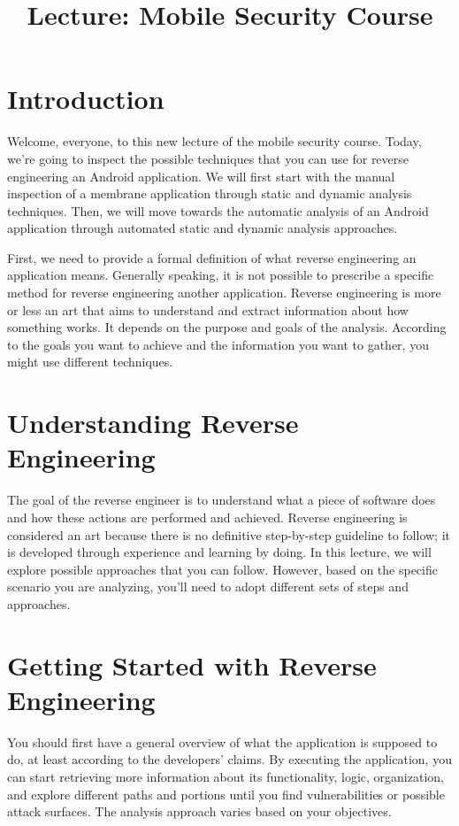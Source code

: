 \documentclass{article}
\title{Lecture: Mobile Security Course}
\author{}
\date{}
\begin{document}
\maketitle

\section*{Introduction}
Welcome, everyone, to this new lecture of the mobile security course. Today, we're going to inspect the possible techniques that you can use for reverse engineering an Android application. We will first start with the manual inspection of a membrane application through static and dynamic analysis techniques. Then, we will move towards the automatic analysis of an Android application through automated static and dynamic analysis approaches.

First, we need to provide a formal definition of what reverse engineering an application means. Generally speaking, it is not possible to prescribe a specific method for reverse engineering another application. Reverse engineering is more or less an art that aims to understand and extract information about how something works. It depends on the purpose and goals of the analysis. According to the goals you want to achieve and the information you want to gather, you might use different techniques.

\section*{Understanding Reverse Engineering}
The goal of the reverse engineer is to understand what a piece of software does and how these actions are performed and achieved. Reverse engineering is considered an art because there is no definitive step-by-step guideline to follow; it is developed through experience and learning by doing. In this lecture, we will explore possible approaches that you can follow. However, based on the specific scenario you are analyzing, you'll need to adopt different sets of steps and approaches.

\section*{Getting Started with Reverse Engineering}
You should first have a general overview of what the application is supposed to do, at least according to the developers' claims. By executing the application, you can start retrieving more information about its functionality, logic, organization, and explore different paths and portions until you find vulnerabilities or possible attack surfaces. The analysis approach varies based on your objectives.
\end{document}
